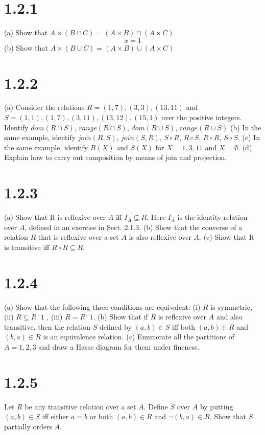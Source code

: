 \documentclass{article}
\begin{document}
\section*{1.2.1}
(a) Show that $A \times  (B \cap C) = (A \times B) \cap (A \times C)$
\begin{equation*}
    x = 1
\end{equation*}
(b) Show that $A \times (B \cup C) = (A \times B) \cup (A \times C)$ 

\section*{1.2.2}
(a) Consider the relations $R={(1,7), (3,3), (13,11)}$ and $S={(1,1), (1,7), (3,11), (13,12), (15,1)}$ over the positive integers. Identify $dom(R\cap S)$, $range(R\cap S)$, $dom(R\cup S)$, $range(R\cup S)$
(b) In the same example, identify $join(R,S)$, $join(S,R)$, $S \circ R$, $R\circ S$, $R \circ R$, $S \circ S$.
(c) In the same example, identify $R(X)$ and $S(X)$ for $X={1,3,11}$ and $X=\emptyset$.
(d) Explain how to carry out composition by means of join and projection.
\section*{1.2.3}
(a) Show that R is reflexive over $A$ iff $I_A \subseteq R$. Here $I_A$ is the identity relation over $A$, defined in an exercise in Sect. 2.1.3.
(b) Show that the converse of a relation $R$ that is reflexive over a set $A$ is also reflexive over $A$. 
(c) Show that R is transitive iff $R \circ R \subseteq R$.
\section*{1.2.4}
(a) Show that the following three conditions are equivalent: (i) $R$ is symmetric, (ii) $R \subseteq R^-1$ , (iii) $R = R^-1$.
(b) Show that if $R$ is reflexive over $A$ and also transitive, then the relation $S$ defined by $(a,b) \in S$ iff both $(a,b) \in R$ and $(b,a) \in R$ is an equivalence relation.
(c) Enumerate all the partitions of $A={1,2,3}$ and draw a Hasse diagram for them under fineness.
\section*{1.2.5}
Let $R$ be any transitive relation over a set $A$. Define $S$ over $A$ by putting $(a,b) \in S$ iff either $a = b$ or both $(a,b) \in R$ and $\neg (b,a) \in R$. Show that $S$ partially orders $A$.
\end{document}
